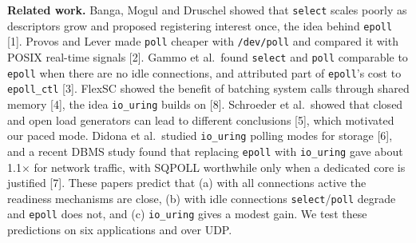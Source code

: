 \documentclass[conference,10pt]{IEEEtran}
\newcommand{\code}[1]{\texttt{#1}}
\begin{document}
\textbf{Related work.} Banga, Mogul and Druschel showed that \code{select} scales poorly as descriptors grow and proposed registering interest once, the idea behind \code{epoll} [1]. Provos and Lever made \code{poll} cheaper with \code{/dev/poll} and compared it with POSIX real-time signals [2]. Gammo et al.\ found \code{select} and \code{poll} comparable to \code{epoll} when there are no idle connections, and attributed part of \code{epoll}'s cost to \code{epoll\_ctl} [3]. FlexSC showed the benefit of batching system calls through shared memory [4], the idea \code{io\_uring} builds on [8]. Schroeder et al.\ showed that closed and open load generators can lead to different conclusions [5], which motivated our paced mode. Didona et al.\ studied \code{io\_uring} polling modes for storage [6], and a recent DBMS study found that replacing \code{epoll} with \code{io\_uring} gave about 1.1$\times$ for network traffic, with SQPOLL worthwhile only when a dedicated core is justified [7]. These papers predict that (a) with all connections active the readiness mechanisms are close, (b) with idle connections \code{select}/\code{poll} degrade and \code{epoll} does not, and (c) \code{io\_uring} gives a modest gain. We test these predictions on six applications and over UDP.

\end{document}
